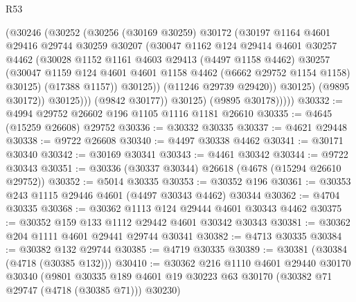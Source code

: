 \begin{lexlean}{R53}
\begin{coremodule}
                      (@30246
                        (@30252
                          (@30256
                            (@30169 @30259)
                            @30172
                            (@30197
                              @1164
                              @4601
                              @29416
                              @29744
                              @30259
                              @30207
                              (@30047
                                @1162
                                @124
                                @29414
                                @4601
                                @30257
                                @4462
                                (@30028
                                  @1152
                                  @1161
                                  @4603
                                  @29413
                                  (@4497 @1158 @4462)
                                  @30257
                                  (@30047
                                    @1159
                                    @124
                                    @4601
                                    @4601
                                    @1158
                                    @4462
                                    (@6662 @29752 @1154 @1158)
                                    @30125)
                                  (@17388 @1157))
                                @30125))
                            (@11246 @29739 @29420))
                          @30125)
                        (@9895 @30172))
                      @30125)))
                (@9842 @30177))
              @30125)
            (@9895 @30178)))))
@30332 := @4994 @29752 @26602 @196 @1105 @1116 @1181 @26610
@30335 := @4645 (@15259 @26608) @29752
@30336 := @30332 @30335
@30337 := @4621 @29448
@30338 := @9722 @26608
@30340 := @4497 @30338 @4462
@30341 := @30171 @30340
@30342 := @30169 @30341
@30343 := @4461 @30342
@30344 := @9722 @30343
@30351 := @30336 (@30337 @30344) @26618 (@4678 (@15294 @26610 @29752))
@30352 := @5014 @30335
@30353 := @30352 @196
@30361 := @30353 @243 @1115 @29446 @4601 (@4497 @30343 @4462) @30344
@30362 := @4704 @30335
@30368 := @30362 @1113 @124 @29444 @4601 @30343 @4462
@30375 := @30352 @159 @133 @1112 @29442 @4601 @30342 @30343
@30381 := @30362 @204 @1111 @4601 @29441 @29744 @30341
@30382 := @4713 @30335
@30384 := @30382 @132 @29744
@30385 := @4719 @30335
@30389 := @30381 (@30384 (@4718 (@30385 @132)))
@30410 := @30362
    @216
    @1110
    @4601
    @29440
    @30170
    @30340
    (@9801 @30335 @189 @4601 @19 @30223 @63 @30170 (@30382 @71 @29747 (@4718 (@30385 @71))) @30230)

\end{coremodule}
\end{lexlean}
